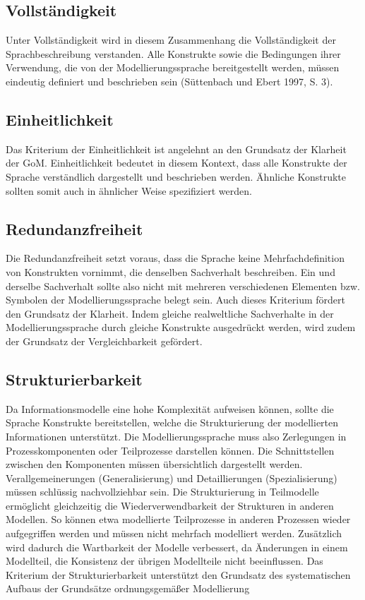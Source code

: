 \subsection{Vollständigkeit}
Unter Vollständigkeit wird in diesem Zusammenhang die Vollständigkeit der Sprachbeschreibung verstanden. Alle Konstrukte sowie die Bedingungen ihrer Verwendung, die von der Modellierungssprache bereitgestellt werden, müssen eindeutig definiert und beschrieben sein (Süttenbach und Ebert 1997, S. 3).
\subsection{Einheitlichkeit}
Das Kriterium der Einheitlichkeit ist angelehnt an den Grundsatz der Klarheit der GoM. Einheitlichkeit bedeutet in diesem Kontext, dass alle Konstrukte der Sprache verständlich dargestellt und beschrieben werden. Ähnliche Konstrukte sollten somit auch in ähnlicher Weise spezifiziert werden.
\subsection{Redundanzfreiheit}
Die Redundanzfreiheit setzt voraus, dass die Sprache keine Mehrfachdefinition von Konstrukten vornimmt, die denselben Sachverhalt beschreiben. Ein und derselbe Sachverhalt sollte also nicht mit mehreren verschiedenen Elementen bzw. Symbolen der Modellierungssprache belegt sein. Auch dieses Kriterium fördert den Grundsatz der Klarheit. Indem gleiche realweltliche Sachverhalte in der Modellierungssprache durch gleiche Konstrukte ausgedrückt werden, wird zudem der Grundsatz der Vergleichbarkeit gefördert.
\subsection{Strukturierbarkeit}
Da Informationsmodelle eine hohe Komplexität aufweisen können, sollte die Sprache Konstrukte bereitstellen, welche die Strukturierung der modellierten Informationen unterstützt. Die Modellierungssprache muss also Zerlegungen in Prozesskomponenten oder Teilprozesse darstellen können. Die Schnittstellen zwischen den Komponenten müssen übersichtlich dargestellt werden. Verallgemeinerungen (Generalisierung) und Detaillierungen (Spezialisierung) müssen schlüssig nachvollziehbar sein. Die Strukturierung in Teilmodelle ermöglicht gleichzeitig die Wiederverwendbarkeit der Strukturen in anderen Modellen. So können etwa modellierte Teilprozesse in anderen Prozessen wieder aufgegriffen werden und müssen nicht mehrfach modelliert werden. Zusätzlich wird dadurch die Wartbarkeit der Modelle verbessert, da Änderungen in einem Modellteil, die Konsistenz der übrigen Modellteile nicht beeinflussen. Das Kriterium der Strukturierbarkeit unterstützt den Grundsatz des systematischen Aufbaus der Grundsätze ordnungsgemäßer Modellierung


